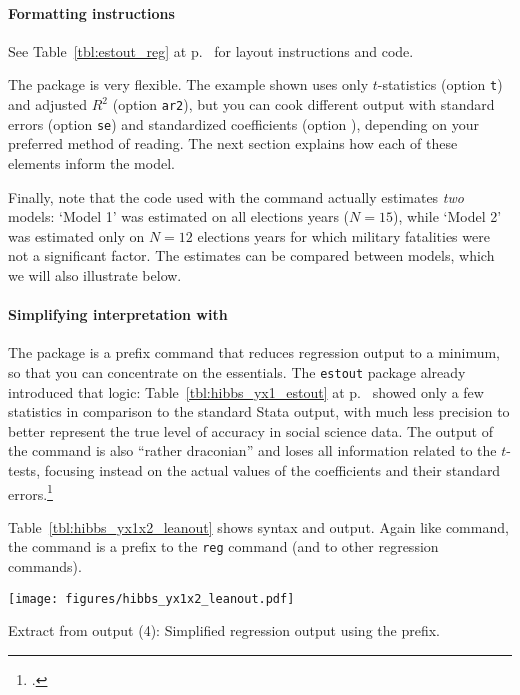 \paragraph{Formatting instructions} See Table~\ref{tbl:estout_reg} at p.~\pageref{tbl:estout_reg} for layout instructions and code.

The  package is very flexible. The example shown uses only $t$-statistics (option \texttt{t}) and adjusted $R^2$ (option \texttt{ar2}), but you can cook different output with standard errors (option \texttt{se}) and standardized coefficients (option ), depending on your preferred method of reading. The next section explains how each of these elements inform the model.

Finally, note that the code used with the  command actually estimates \emph{two} models: `Model 1' was estimated on all elections years ($N=15$), while `Model 2' was estimated only on $N=12$ elections years for which military fatalities were not a significant factor. The estimates can be compared between models, which we will also illustrate below.

	
	\paragraph{Simplifying interpretation with }%
	\label{sec:leanout}
	The  package is a prefix command that reduces regression output to a minimum, so that you can concentrate on the essentials. The \texttt{estout} package already introduced that logic: Table~\ref{tbl:hibbs_yx1_estout} at p.~\pageref{tbl:hibbs_yx1_estout} showed only a few statistics in comparison to the standard Stata output, with much less precision to better represent the true level of accuracy in social science data. The output of the  command is also ``rather draconian'' and loses all information related to the $t$-tests, focusing instead on the actual values of the coefficients and their standard errors.\footcite{Beck:2011a}

	Table~\ref{tbl:hibbs_yx1x2_leanout} shows  syntax and output. Again like  command, the  command is a prefix to the \texttt{reg} command (and to other regression commands).
	
	\begin{table}[htp]
		\texttt{[image: figures/hibbs\_yx1x2\_leanout.pdf]}

	  	\caption[Extract from  output (4): Simplified regression output]{\label{tbl:hibbs_yx1x2_leanout}
		Extract from  output (4): Simplified regression output using the  prefix.\\
		}
	\end{table}%
	
